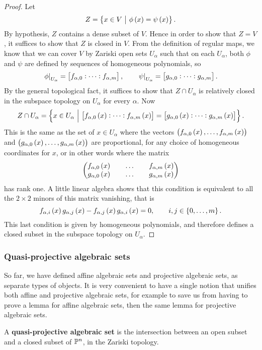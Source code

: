 \begin{proof}
Let
$$ Z = \cbr{x \in V \st \phi\br{x} = \psi\br{x}}. $$
By hypothesis, $ Z $ contains a dense subset of $ V $. Hence in order to show that $ Z = V $, it suffices to show that $ Z $ is closed in $ V $. From the definition of regular maps, we know that we can cover $ V $ by Zariski open sets $ U_\alpha $ such that on each $ U_\alpha $, both $ \phi $ and $ \psi $ are defined by sequences of homogeneous polynomials, so
$$ \eval{\phi}_{U_\alpha} = \sbr{f_{\alpha, 0} : \dots : f_{\alpha, m}}, \qquad \eval{\psi}_{U_\alpha} = \sbr{g_{\alpha, 0} : \dots : g_{\alpha, m}}. $$
By the general topological fact, it suffices to show that $ Z \cap U_\alpha $ is relatively closed in the subspace topology on $ U_\alpha $ for every $ \alpha $. Now
$$ Z \cap U_\alpha = \cbr{x \in U_\alpha \st \sbr{f_{\alpha, 0}\br{x} : \dots : f_{\alpha, m}\br{x}} = \sbr{g_{\alpha, 0}\br{x} : \dots : g_{\alpha, m}\br{x}}}. $$
This is the same as the set of $ x \in U_\alpha $ where the vectors $ \br{f_{\alpha, 0}\br{x}, \dots, f_{\alpha, m}\br{x}} $ and $ \br{g_{\alpha, 0}\br{x}, \dots, g_{\alpha, m}\br{x}} $ are proportional, for any choice of homogeneous coordinates for $ x $, or in other words where the matrix
$$ \twobyone{f_{\alpha, 0}\br{x} \qquad \dots \qquad f_{\alpha, m}\br{x}}{g_{\alpha, 0}\br{x} \qquad \dots \qquad g_{\alpha, m}\br{x}} $$
has rank one. A little linear algebra shows that this condition is equivalent to all the $ 2 \times 2 $ minors of this matrix vanishing, that is
$$ f_{\alpha, i}\br{x}g_{\alpha, j}\br{x} - f_{\alpha, j}\br{x}g_{\alpha, i}\br{x} = 0, \qquad i, j \in \cbr{0, \dots, m}. $$
This last condition is given by homogeneous polynomials, and therefore defines a closed subset in the subspace topology on $ U_\alpha $.
\end{proof}

\subsubsection{Quasi-projective algebraic sets}

So far, we have defined affine algebraic sets and projective algebraic sets, as separate types of objects. It is very convenient to have a single notion that unifies both affine and projective algebraic sets, for example to save us from having to prove a lemma for affine algebraic sets, then the same lemma for projective algebraic sets.

\begin{definition*}
A \textbf{quasi-projective algebraic set} is the intersection between an open subset and a closed subset of $ \mathbb{P}^n $, in the Zariski topology.
\end{definition*}

